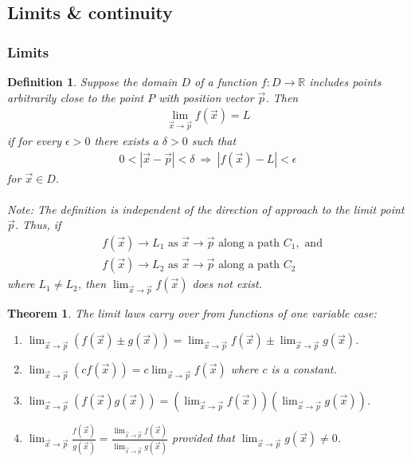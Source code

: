 \documentclass{article}
\theoremstyle{sltheorem}
\newtheorem{definition}{Definition}[section]
\newtheorem{theorem}{Theorem}[section]
\newcommand{\R}{\mathbb{R}}
\begin{document}
\subsection{Limits \& continuity}
\subsubsection{Limits}
\begin{definition}
    Suppose the domain $D$ of a function $f:D\to\R$ includes points
    arbitrarily close to the point $P$ with position vector $\vec p$.
    Then
    \begin{align*}
        \lim_{\vec x\to \vec p}f(\vec x)=L
    \end{align*}
    if for every $\epsilon>0$ there exists a $\delta > 0$ such that
    \begin{align*}
        0 < |\vec x - \vec p| < \delta \:\Rightarrow\: |f(\vec x)-L|<\epsilon
    \end{align*}
    for $\vec x \in D$.\\\\
    Note: The definition is independent of the direction of approach to the
    limit point $\vec p$. Thus, if
    \begin{align*}
        &f(\vec x)\to L_1 \text{ as } \vec x\to\vec p \text{ along a path } C_1, \text{ and}\\
        &f(\vec x)\to L_2 \text{ as } \vec x\to\vec p \text{ along a path } C_2
    \end{align*}
    where $L_1 \not= L_2$, then $\lim_{\vec x\to\vec p} f(\vec x)$ does not exist.
\end{definition}
\begin{theorem}
    The limit laws carry over from functions of one variable case:
    \begin{enumerate}
        \item $\lim_{\vec x\to\vec p}\left(f(\vec x)\pm g(\vec x)\right) =
               \lim_{\vec x\to\vec p}f(\vec x)\pm\lim_{\vec x\to\vec p}g(\vec x)$.
        \item $\lim_{\vec x\to\vec p}\left(cf(\vec x)\right) =
              c\lim_{\vec x\to\vec p}f(\vec x)$ where $c$ is a constant.
        \item $\lim_{\vec x\to\vec p}\left(f(\vec x)g(\vec x)\right) =
               \left(\lim_{\vec x\to\vec p}f(\vec x)\right)
               \left(\lim_{\vec x\to\vec p}g(\vec x)\right)$.
        \item $\lim_{\vec x\to\vec p}\frac{f(\vec x)}{g(\vec x)}
               =\frac{\lim_{\vec x\to\vec p}f(\vec x)}{\lim_{\vec x\to\vec p}g(\vec x)}$
               provided that $\lim_{\vec x\to\vec p}g(\vec x)\not=0$.
    \end{enumerate}
\end{theorem}
\end{document}
